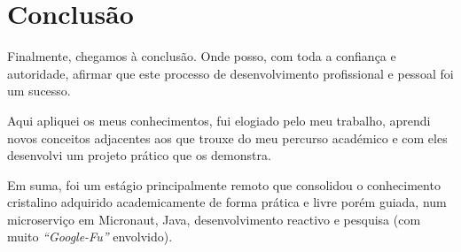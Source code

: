 \chapter{Conclusão}\label{cap6}

Finalmente, chegamos à conclusão. Onde posso, com toda a confiança e autoridade, afirmar que este processo de desenvolvimento profissional e pessoal foi um sucesso.

Aqui apliquei os meus conhecimentos, fui elogiado pelo meu trabalho, aprendi novos conceitos adjacentes aos que trouxe do meu percurso académico e com eles desenvolvi um projeto prático que os demonstra.

Em suma, foi um estágio principalmente remoto que consolidou o conhecimento cristalino adquirido academicamente de forma prática e livre porém guiada, num microserviço em Micronaut, Java, desenvolvimento reactivo e pesquisa (com muito \textit{``Google-Fu''} envolvido).
